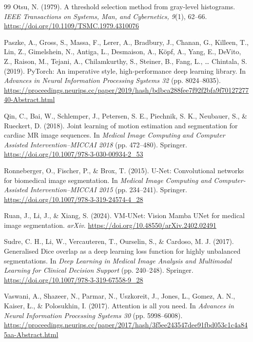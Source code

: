 \begin{thebibliography}{99}
Otsu, N. (1979). A threshold selection method from gray-level histograms. \textit{IEEE Transactions on Systems, Man, and Cybernetics, 9}(1), 62--66. \url{https://doi.org/10.1109/TSMC.1979.4310076}

Paszke, A., Gross, S., Massa, F., Lerer, A., Bradbury, J., Chanan, G., Killeen, T., Lin, Z., Gimelshein, N., Antiga, L., Desmaison, A., K{\"o}pf, A., Yang, E., DeVito, Z., Raison, M., Tejani, A., Chilamkurthy, S., Steiner, B., Fang, L., \ldots{} Chintala, S. (2019). PyTorch: An imperative style, high-performance deep learning library. In \textit{Advances in Neural Information Processing Systems 32} (pp. 8024--8035). \url{https://proceedings.neurips.cc/paper/2019/hash/bdbca288fee7f92f2bfa9f7012727740-Abstract.html}

Qin, C., Bai, W., Schlemper, J., Petersen, S. E., Piechnik, S. K., Neubauer, S., \& Rueckert, D. (2018). Joint learning of motion estimation and segmentation for cardiac MR image sequences. In \textit{Medical Image Computing and Computer Assisted Intervention--MICCAI 2018} (pp. 472--480). Springer. \url{https://doi.org/10.1007/978-3-030-00934-2_53}

Ronneberger, O., Fischer, P., \& Brox, T. (2015). U-Net: Convolutional networks for biomedical image segmentation. In \textit{Medical Image Computing and Computer-Assisted Intervention--MICCAI 2015} (pp. 234--241). Springer. \url{https://doi.org/10.1007/978-3-319-24574-4_28}

Ruan, J., Li, J., \& Xiang, S. (2024). VM-UNet: Vision Mamba UNet for medical image segmentation. \textit{arXiv}. \url{https://doi.org/10.48550/arXiv.2402.02491}

Sudre, C. H., Li, W., Vercauteren, T., Ourselin, S., \& Cardoso, M. J. (2017). Generalised Dice overlap as a deep learning loss function for highly unbalanced segmentations. In \textit{Deep Learning in Medical Image Analysis and Multimodal Learning for Clinical Decision Support} (pp. 240--248). Springer. \url{https://doi.org/10.1007/978-3-319-67558-9_28}

Vaswani, A., Shazeer, N., Parmar, N., Uszkoreit, J., Jones, L., Gomez, A. N., Kaiser, {\L}., \& Polosukhin, I. (2017). Attention is all you need. In \textit{Advances in Neural Information Processing Systems 30} (pp. 5998--6008). \url{https://proceedings.neurips.cc/paper/2017/hash/3f5ee243547dee91fbd053c1c4a845aa-Abstract.html}


\end{thebibliography}
